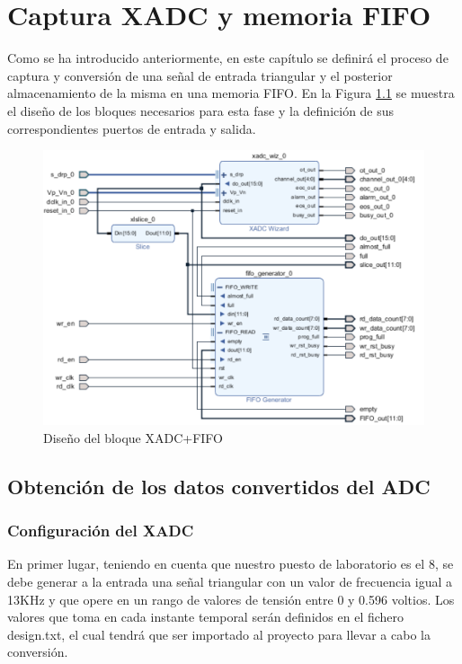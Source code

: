 \chapter{Captura XADC y memoria FIFO}
\label{section:xadc_fifo}


Como se ha introducido anteriormente, en este capítulo se definirá el proceso de captura y conversión de una señal de entrada triangular y el posterior almacenamiento de la misma en una memoria FIFO. En la Figura \ref{fig:xadc_fifo} se muestra el diseño de los bloques necesarios para esta fase y la definición de sus correspondientes puertos de entrada y salida.

\vspace{3mm}

    \begin{figure}[h]
    	\centering
    	\includegraphics[width=1\textwidth]{img/diseno/xadc_fifo.PNG}
    	\caption{Diseño del bloque XADC+FIFO}
    	\label{fig:xadc_fifo}
    \end{figure}
    
\vspace{3mm}

\section{Obtención de los datos convertidos del ADC}

\subsection{Configuración del XADC}

En primer lugar, teniendo en cuenta que nuestro puesto de laboratorio es el 8, se debe generar a la entrada una señal triangular con un valor de frecuencia igual a 13KHz y que opere en un rango de valores de tensión entre 0 y 0.596 voltios. Los valores que toma en cada instante temporal serán definidos en el fichero design.txt, el cual tendrá que ser importado al proyecto para llevar a cabo la conversión.

